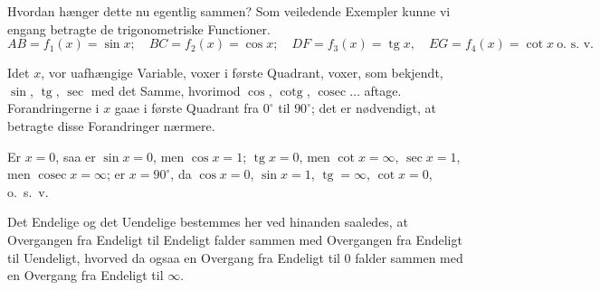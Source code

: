 \documentclass[12pt]{book}
\begin{document}
Hvordan hænger dette nu egentlig sammen? Som veiledende Exempler kunne vi engang
betragte de trigonometriske Functioner.
\[
AB = f_1(x) = \sin x;\quad BC = f_2(x) = \cos x;\quad
DF = f_3(x) = \operatorname{tg} x,\quad EG = f_4(x) = \cot x \ \text{o.\ s.\ v.}
\]

\begin{center}
\end{center}

Idet $x$, vor uafhængige Variable, voxer i første Quadrant, voxer, som bekjendt,
$\sin$, $\operatorname{tg}$, $\sec$ med det Samme, hvorimod $\cos$,
$\operatorname{cotg}$, $\operatorname{cosec}\ldots$ aftage. Forandringerne i $x$
gaae i første Quadrant fra $0^{\circ}$ til $90^{\circ}$; det er nødvendigt, at
betragte disse Forandringer nærmere.

Er $x = 0$, saa er $\sin x = 0$, men $\cos x = 1$; $\operatorname{tg} x = 0$, men
$\cot x = \infty$, $\sec x = 1$, men $\operatorname{cosec} x = \infty$; er
$x = 90^{\circ}$, da $\cos x = 0$, $\sin x = 1$, $\operatorname{tg} = \infty$,
$\cot x = 0$, o.\ s.\ v.

Det Endelige og det Uendelige bestemmes her ved hinanden saaledes, at Overgangen
fra Endeligt til Endeligt falder sammen med Overgangen fra Endeligt til
Uendeligt, hvorved da ogsaa en Overgang fra Endeligt til $0$ falder sammen med en
Overgang fra Endeligt til $\infty$.
\end{document}
